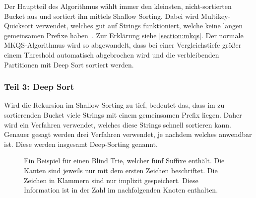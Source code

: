 Der Hauptteil des Algorithmus wählt immer den kleinsten, nicht-sortierten Bucket aus und sortiert ihn mittels Shallow Sorting.
Dabei wird Multikey-Quicksort verwendet, welches gut auf Strings funktioniert, welche keine langen gemeinsamen Prefixe haben~\cite{saca:4}.
Zur Erklärung siehe \cref{section:mkqs}.
Der normale MKQS-Algorithmus wird so abgewandelt, dass bei einer Vergleichstiefe größer einem Threshold automatisch abgebrochen wird und die verbleibenden Partitionen mit Deep Sort sortiert werden.

\subsubsection{Teil 3: Deep Sort}

Wird die Rekursion im Shallow Sorting zu tief, bedeutet das, dass im zu sortierenden Bucket viele Strings mit einem gemeinsamen Prefix liegen.
Daher wird ein Verfahren verwendet, welches diese Strings schnell sortieren kann.
Genauer gesagt werden drei Verfahren verwendet, je nachdem welches anwendbar ist.
Diese werden insgesamt Deep-Sorting genannt.

\begin{figure}[!h]
\centering
\newcommand{\tnode}{\node[draw,circle]}
\newcommand{\trans}{\draw[-stealth]}
\caption[Beispiel für einen Blind Trie]{Ein Beispiel für einen Blind Trie, welcher fünf Suffixe enthält. Die Kanten sind jeweils nur mit dem ersten Zeichen beschriftet. Die Zeichen in Klammern sind nur implizit gespeichert. Diese Information ist in der Zahl im nachfolgenden Knoten enthalten.}
\label{fg:blindtrie}
\end{figure}

